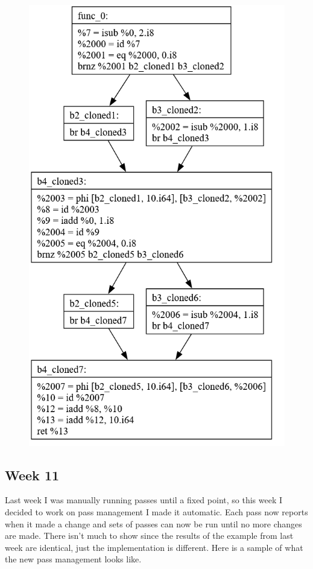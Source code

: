 \documentclass[11pt, a4paper, titlepage]{article}
\begin{document}
\begin{figure}[H]
  \includegraphics[scale=0.3]{images/i47.png}
\end{figure}

\subsection{Week 11}

Last week I was manually running passes until a fixed point, so this week I decided to work on pass management I made it automatic. Each pass now reports when it made a change and sets of passes can now be run until no more changes are made. There isn't much to show since the results of the example from last week are identical, just the implementation is different. Here is a sample of what the new pass management looks like.
\end{document}
